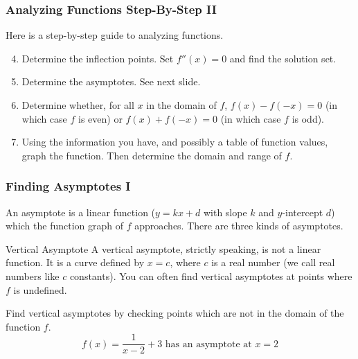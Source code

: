 \documentclass[xcolor=dvipsnames]{beamer}
\begin{document}
\begin{frame}
  \frametitle{Analyzing Functions Step-By-Step II}
Here is a step-by-step guide to analyzing functions.
\begin{enumerate}
\setcounter{enumi}{3}
\item Determine the inflection points. Set $f''(x)=0$ and find the
  solution set.
\item Determine the asymptotes. See next slide.
\item Determine whether, for all $x$ in the domain of $f$,
  $f(x)-f(-x)=0$ (in which case $f$ is even) or $f(x)+f(-x)=0$ (in
  which case $f$ is odd).
\item Using the information you have, and possibly a table of function
  values, graph the function. Then determine the domain and range of
  $f$.
\end{enumerate}
\end{frame}

\begin{frame}
  \frametitle{Finding Asymptotes I}
An asymptote is a linear function ($y=kx+d$ with slope $k$ and
$y$-intercept $d$) which the function graph of $f$ approaches. There
are three kinds of asymptotes.
\begin{block}{Vertical Asymptote}
  A vertical asymptote, strictly speaking, is not a linear function.
  It is a curve defined by $x=c$, where $c$ is a real number (we call
  real numbers like $c$ \alert{constants}). You can often find
  vertical asymptotes at points where $f$ is undefined.
\end{block}
Find vertical asymptotes by checking points which are not in the
domain of the function $f$. 
\begin{equation}
  \label{eq:peimoojo}
f(x)=\frac{1}{x-2}+3\mbox{ has an asymptote at }x=2
\end{equation}
\end{frame}
\end{document}
